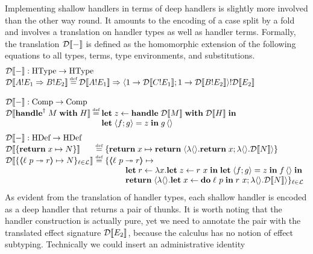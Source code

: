 \documentclass[12pt,phd,lfcs,twoside,openright,logo,leftchapter,normalheadings]{infthesis}
\theoremstyle{plain}
\theoremstyle{definition}
\begin{document}
Implementing shallow handlers in terms of deep handlers is slightly
more involved than the other way round.
%
It amounts to the encoding of a case split by a fold and involves a
translation on handler types as well as handler terms.
%
Formally, the translation $\mathcal{D}\llbracket - \rrbracket$ is defined as the homomorphic
extension of the following equations to all types, terms, type
environments, and substitutions.
%
\[
  \bl
  \sdtrans{-} : \HandlerTypeCat \to \HandlerTypeCat\\
  \sdtrans{A\eff E_1 \Rightarrow B\eff E_2} \defas
  \sdtrans{A\eff E_1} \Rightarrow \Record{\UnitType \to \sdtrans{C \eff E_1}; \UnitType \to \sdtrans{B \eff E_2}} \eff \sdtrans{E_2} \medskip \medskip\\
  \sdtrans{-} : \CompCat \to \CompCat\\
  \sdtrans{\ShallowHandle \; M \; \With \; H} \defas
      \ba[t]{@{}l}
      \Let\;z \revto \Handle \; \sdtrans{M} \; \With \; \sdtrans{H} \; \In\\
      \Let\;\Record{f; g} = z \;\In\;
      g\,\Unit
      \ea \medskip\\
  \sdtrans{-} : \HandlerCat \to \HandlerCat\\
  \ba{@{}l@{~}c@{~}l}
    \sdtrans{\{\Return \; x \mapsto N\}} &\defas&
      \{\Return \; x \mapsto \Return\; \Record{\lambda \Unit.\Return\; x; \lambda \Unit.\sdtrans{N}}\} \\
      \sdtrans{\{\OpCase{\ell}{p}{r} \mapsto N\}_{\ell \in \mathcal{L}}} &\defas& \{
    \bl
    \OpCase{\ell}{p}{r} \mapsto\\
    \qquad\bl\Let \;r \revto
       \lambda x. \Let\; z \revto r~x\;\In\;
                  \Let\; \Record{f; g} = z\; \In\; f\,\Unit\;\In\\
       \Return\;\Record{\lambda \Unit.\Let\; x \revto \Do\;\ell~p\; \In\; r~x; \lambda \Unit.\sdtrans{N}}\}_{\ell \in \mathcal{L}}
    \el
    \el
    \ea
    \el
\]
%
As evident from the translation of handler types, each shallow handler
is encoded as a deep handler that returns a pair of thunks. It is
worth noting that the handler construction is actually pure, yet we
need to annotate the pair with the translated effect signature
$\mathcal{D}\llbracket E_2 \rrbracket$, because the calculus has no notion of effect
subtyping. Technically we could insert an administrative identity
\end{document}
